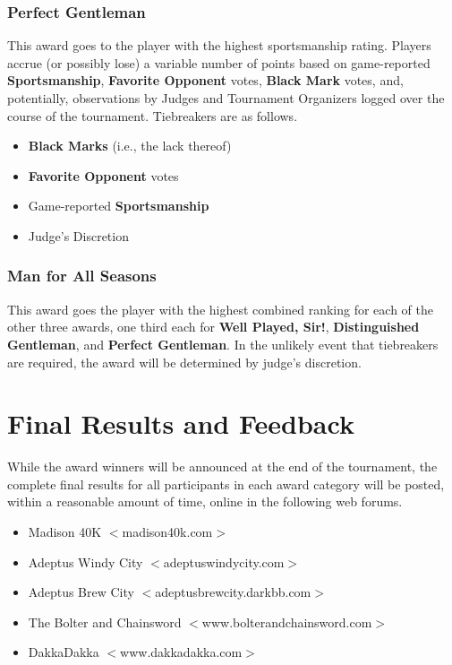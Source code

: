\documentclass[12pt,titlepage]{article}
\begin{document}
\subsubsection*{Perfect Gentleman}

This award goes to the player with the highest sportsmanship rating. Players accrue (or possibly lose) a variable number of points based on game-reported \textbf{Sportsmanship}, \textbf{Favorite Opponent} votes, \textbf{Black Mark} votes, and, potentially, observations by Judges and Tournament Organizers logged over the course of the tournament. Tiebreakers are as follows.

\begin{itemize}
\item \textbf{Black Marks} (i.e., the lack thereof)
\item \textbf{Favorite Opponent} votes
\item Game-reported \textbf{Sportsmanship}
\item Judge's Discretion
\end{itemize}

\subsubsection*{Man for All Seasons}

This award goes the player with the highest combined ranking for each of the other three awards, one third each for \textbf{Well Played, Sir!}, \textbf{Distinguished Gentleman}, and \textbf{Perfect Gentleman}. In the unlikely event that tiebreakers are required, the award will be determined by judge's discretion.

\newpage

\section*{Final Results and Feedback}

While the award winners will be announced at the end of the tournament, the complete final results for all participants in each award category will be posted, within a reasonable amount of time, online in the following web forums.

\begin{itemize}
\item Madison 40K $<$madison40k.com$>$
\item Adeptus Windy City $<$adeptuswindycity.com$>$
\item Adeptus Brew City $<$adeptusbrewcity.darkbb.com$>$
\item The Bolter and Chainsword $<$www.bolterandchainsword.com$>$
\item DakkaDakka $<$www.dakkadakka.com$>$
\end{itemize}
\end{document}
